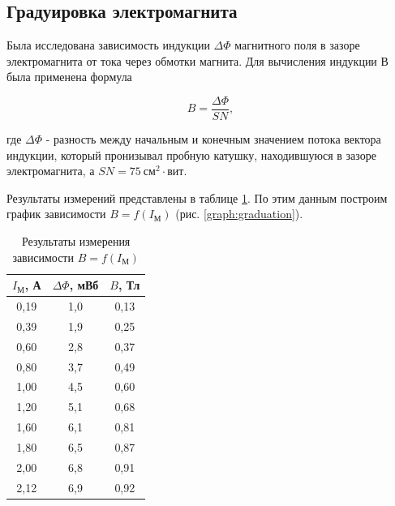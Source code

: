 \documentclass[a4paper, 12pt]{article}
\begin{document}
    \subsection{Градуировка электромагнита}
    
    Была исследована зависимость индукции $\Delta \Phi$ магнитного поля в зазоре электромагнита от тока через обмотки магнита. Для вычисления индукции $В$ была применена формула

    \begin{equation}
        B = \frac{\Delta \Phi}{SN},
    \end{equation}

    где $\Delta \Phi$ - разность между начальным и конечным значением потока вектора индукции, который пронизывал пробную катушку, находившуюся в зазоре электромагнита, а $SN = 75 \: \text{см}^2 \cdot \text{вит}$.
    
    Результаты измерений представлены в таблице \ref{graduation}. По этим данным построим график зависимости $B = f(I_\text{М})$ (рис. \ref{graph:graduation}).

    \begin{table}[H]
        \centering
        \begin{tabular}{|c|c|c|}
        \hline
        $I_\text{М}$, А & $\Delta \Phi$, мВб & $B$, Тл \\ \hline
        0,19 & 1,0 & 0,13 \\ \hline
        0,39 & 1,9 & 0,25 \\ \hline
        0,60 & 2,8 & 0,37 \\ \hline
        0,80 & 3,7 & 0,49 \\ \hline
        1,00 & 4,5 & 0,60 \\ \hline
        1,20 & 5,1 & 0,68 \\ \hline
        1,60 & 6,1 & 0,81 \\ \hline
        1,80 & 6,5 & 0,87 \\ \hline
        2,00 & 6,8 & 0,91 \\ \hline
        2,12 & 6,9 & 0,92 \\ \hline
        \end{tabular}
        \caption{Результаты измерения зависимости $B = f(I_\text{М})$}
        \label{graduation}
    \end{table}
\end{document}
